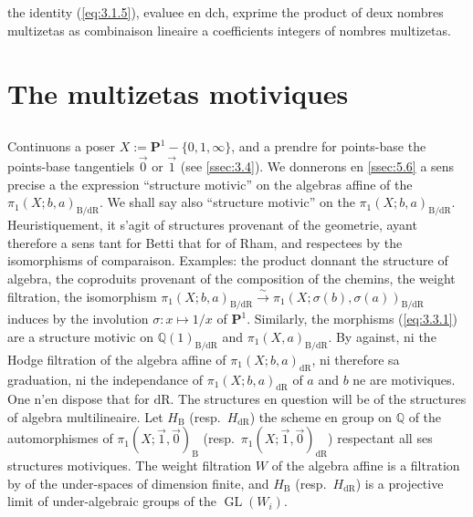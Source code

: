 \documentclass[11pt,a4paper]{article}
\theoremstyle{plain}
\theoremstyle{definition}
\DeclareMathOperator{\GL}{GL}
\newcommand{\Q}{\mathbb{Q}}
\newcommand{\dR}{\mathrm{dR}}
\newcommand{\B}{\mathrm{B}}
\begin{document}
\subsection{}\label{ssec:3.6}

the identity (\ref{eq:3.1.5}), evaluee en $\mathrm{dch}$, exprime the product of deux nombres multizetas as combinaison lineaire a coefficients integers of nombres multizetas.

\section{The multizetas motiviques}\label{sec:4}

\subsection{}\label{ssec:4.1}

Continuons a poser $X := \mathbf{P}^1 - \{0,1,\infty\}$, and a prendre for points-base the points-base tangentiels $\vec{0}$ or $\vec{1}$ (see \ref{ssec:3.4}). We donnerons en \ref{ssec:5.6} a sens precise a the expression ``structure motivic'' on the algebras affine of the $\pi_1(X;b,a)_{\B/\dR}$. We shall say also ``structure motivic'' on the $\pi_1(X;b,a)_{\B/\dR}$. Heuristiquement, it s'agit of structures provenant of the geometrie, ayant therefore a sens tant for Betti that for of Rham, and respectees by the isomorphisms of comparaison. Examples: the product donnant the structure of algebra, the coproduits provenant of the composition of the chemins, the weight filtration, the isomorphism $\pi_1(X;b,a)_{\B/\dR} \xrightarrow{\sim} \pi_1(X;\sigma(b),\sigma(a))_{\B/\dR}$ induces by the involution $\sigma: x \mapsto 1/x$ of $\mathbf{P}^1$. Similarly, the morphisms (\ref{eq:3.3.1}) are a structure motivic on $\Q(1)_{\B/\dR}$ and $\pi_1(X,a)_{\B/\dR}$. By against, ni the Hodge filtration of the algebra affine of $\pi_1(X;b,a)_{\dR}$, ni therefore sa graduation, ni the independance of $\pi_1(X;b,a)_{\dR}$ of $a$ and $b$ ne are motiviques. One n'en dispose that for $\dR$. The structures en question will be of the structures of algebra multilineaire. Let $H_{\B}$ (resp.~$H_{\dR}$) the scheme en group on $\Q$ of the automorphismes of $\pi_1(X;\vec{1},\vec{0})_{\B}$ (resp.~$\pi_1(X;\vec{1},\vec{0})_{\dR}$) respectant all ses structures motiviques. The weight filtration $W$ of the algebra affine is a filtration by of the under-spaces of dimension finite, and $H_{\B}$ (resp.~$H_{\dR}$) is a projective limit of under-algebraic groups of the $\GL(W_i)$.
\end{document}
